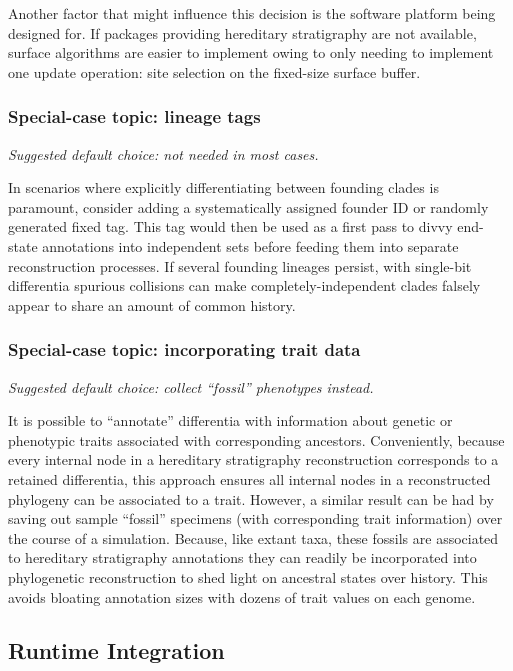 Another factor that might influence this decision is the software platform being designed for.
If packages providing hereditary stratigraphy are not available, surface algorithms are easier to implement owing to only needing to implement one update operation: site selection on the fixed-size surface buffer.

\subsubsection{Special-case topic: lineage tags}
\textit{Suggested default choice: not needed in most cases.}

In scenarios where explicitly differentiating between founding clades is paramount, consider adding a systematically assigned founder ID or randomly generated fixed tag.
This tag would then be used as a first pass to divvy end-state annotations into independent sets before feeding them into separate reconstruction processes.
If several founding lineages persist, with single-bit differentia spurious collisions can make completely-independent clades falsely appear to share an amount of common history.

\subsubsection{Special-case topic: incorporating trait data}
\textit{Suggested default choice: collect ``fossil'' phenotypes instead.}

It is possible to ``annotate'' differentia with information about genetic or phenotypic traits associated with corresponding ancestors.
Conveniently, because every internal node in a hereditary stratigraphy reconstruction corresponds to a retained differentia, this approach ensures all internal nodes in a reconstructed phylogeny can be associated to a trait.
However, a similar result can be had by saving out sample ``fossil'' specimens (with corresponding trait information) over the course of a simulation.
Because, like extant taxa, these fossils are associated to hereditary stratigraphy annotations they can readily be incorporated into phylogenetic reconstruction to shed light on ancestral states over history.
This avoids bloating annotation sizes with dozens of trait values on each genome.

\subsection{Runtime Integration}

